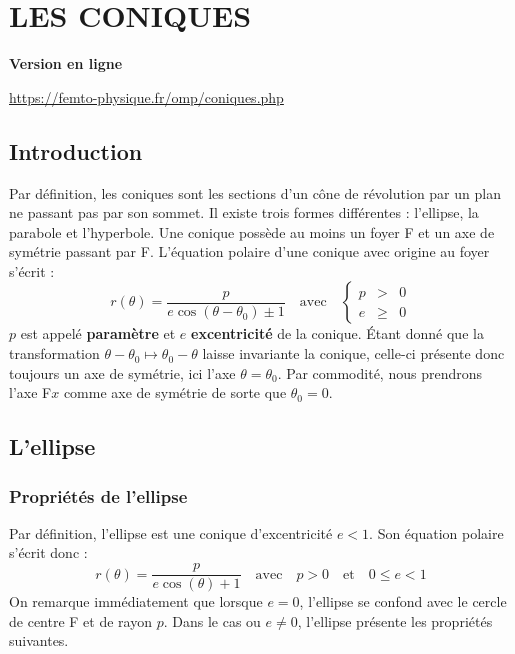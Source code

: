 \setchapterpreamble[u]{\margintoc} 
\chapter{LES CONIQUES}

\begin{center}
\textbf{Version en ligne}

	\url{https://femto-physique.fr/omp/coniques.php}
\end{center}


\section{Introduction}
Par définition, les coniques sont les sections d'un cône de révolution par un plan ne passant pas par son sommet. Il existe trois formes différentes : l'ellipse, la parabole et l'hyperbole. Une conique possède au moins un foyer F et un axe de symétrie passant par F. L'équation polaire d'une conique avec origine au foyer s'écrit : 
\[
r(\theta)=\frac{p}{e\cos(\theta-\theta_{0}) \pm 1}
\quad\text{avec}\quad
\left\{\begin{array}{ccc}
p	&>& 0   \\
e	&\geq& 0  
\end{array}\right.
\]
$p$ est appelé \textbf{paramètre} et $e$ \textbf{excentricité} de la conique. Étant donné que la transformation $\theta-\theta_{0}\mapsto \theta_{0}-\theta$ laisse invariante la conique, celle-ci présente donc toujours un axe de symétrie, ici l'axe $\theta=\theta_{0}$. Par commodité, nous prendrons l'axe F$x$ comme axe de symétrie de sorte que $\theta_{0}=0$.

 
\section{L'ellipse}
\subsection{Propriétés de l'ellipse}
Par définition, l'ellipse est une conique d'excentricité $e<1$. Son équation polaire s'écrit donc :
\begin{equation}
r(\theta)=\frac{p}{e\cos(\theta) +1}
\quad\text{avec}\quad
p>0 \quad\text{et}\quad 0\leq	e<1
\label{eq:C7equation_polaire_ellipse}
\end{equation}
On remarque immédiatement que lorsque $e=0$, l'ellipse se confond avec le cercle de centre F et de rayon $p$. Dans le cas ou $e\neq 0$, l'ellipse présente les propriétés suivantes.

